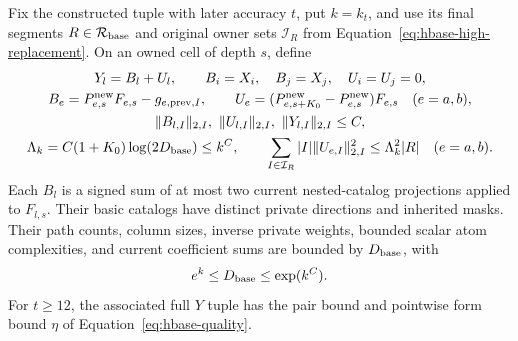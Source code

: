 \begin{proposition}
\label{prop:hbase-data}
Fix the constructed tuple with later accuracy \(t\), put \(k=k_t\),
and use its final segments \(R\in\mathcal R_{\rm base}\) and original owner
sets \(\mathcal I_R\) from Equation~\eqref{eq:hbase-high-replacement}.
On an owned cell of depth \(s\), define
\begin{equation}
 \begin{gathered}
 Y_l=B_l+U_l,\qquad B_i=X_i,\quad B_j=X_j,\quad U_i=U_j=0,\\
 B_e=P^{\rm new}_{e,s}F_{e,s}-g_{e,\mathrm{prev},I},\qquad
 U_e=(P^{\rm new}_{e,s+K_0}-P^{\rm new}_{e,s})F_{e,s}
       \quad(e=a,b),\\
 \|B_{l,I}\|_{2,I},\ \|U_{l,I}\|_{2,I},\ \|Y_{l,I}\|_{2,I}\le C,\\
 \Lambda_k=C(1+K_0)\log(2D_{\rm base})\le k^C,\qquad
 \sum_{I\in\mathcal I_R}|I|\|U_{e,I}\|_{2,I}^2
       \le\Lambda_k^2|R|\quad(e=a,b).
 \end{gathered}                                               \label{eq:h-base-data}
\end{equation}
Each \(B_l\) is a signed sum of at most two current nested-catalog
projections applied to \(F_{l,s}\).  Their basic catalogs have
distinct private directions and inherited masks.  Their path counts,
column sizes, inverse private weights, bounded scalar atom
complexities, and current coefficient sums are bounded by
\(D_{\rm base}\), with
\[
 e^k\le D_{\rm base}\le\exp(k^C).
\]
For \(t\ge12\), the associated full \(Y\) tuple has the pair bound
and pointwise form bound \(\eta\) of Equation~\eqref{eq:hbase-quality}.


\end{proposition}
